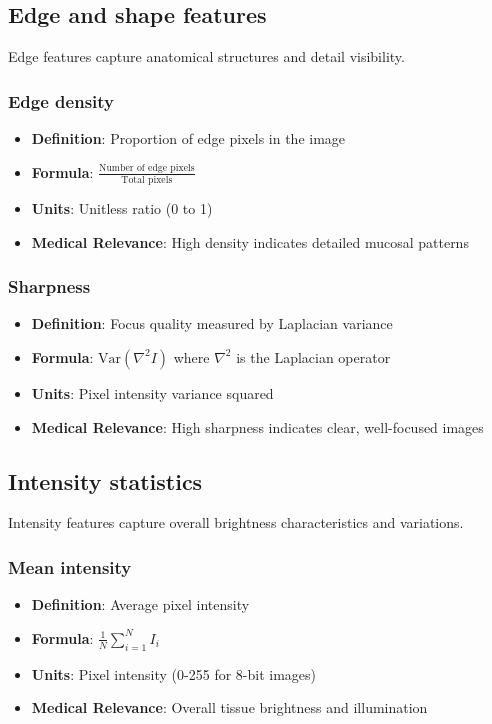 \documentclass[11pt]{article}
\begin{document}
\subsection{Edge and shape features}

Edge features capture anatomical structures and detail visibility.

\subsubsection{Edge density}
\begin{itemize}
    \item \textbf{Definition}: Proportion of edge pixels in the image
    \item \textbf{Formula}: $\displaystyle \frac{\text{Number of edge pixels}}{\text{Total pixels}}$
    \item \textbf{Units}: Unitless ratio (0 to 1)
    \item \textbf{Medical Relevance}: High density indicates detailed mucosal patterns
\end{itemize}

\subsubsection{Sharpness}
\begin{itemize}
    \item \textbf{Definition}: Focus quality measured by Laplacian variance
    \item \textbf{Formula}: $\text{Var}(\nabla^2 I)$ where $\nabla^2$ is the Laplacian operator
    \item \textbf{Units}: Pixel intensity variance squared
    \item \textbf{Medical Relevance}: High sharpness indicates clear, well-focused images
\end{itemize}

\subsection{Intensity statistics}

Intensity features capture overall brightness characteristics and variations.

\subsubsection{Mean intensity}
\begin{itemize}
    \item \textbf{Definition}: Average pixel intensity
    \item \textbf{Formula}: $\displaystyle \frac{1}{N}\sum_{i=1}^N I_i$
    \item \textbf{Units}: Pixel intensity (0-255 for 8-bit images)
    \item \textbf{Medical Relevance}: Overall tissue brightness and illumination
\end{itemize}
\end{document}
